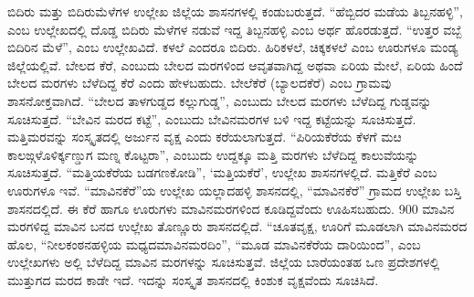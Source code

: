 ಬಿದಿರು ಮತ್ತು ಬಿದಿರುಮೆಳೆಗಳ ಉಲ್ಲೇಖ ಜಿಲ್ಲೆಯ ಶಾಸನಗಳಲ್ಲಿ ಕಂಡುಬರುತ್ತದೆ. “ಹೆಬ್ಬಿದರ ಮಡೆಯ ತಿಬ್ಬನಹಳ್ಳಿ”, ಎಂಬ ಉಲ್ಲೇಖದಲ್ಲಿ ದೊಡ್ಡ ಬಿದಿರು ಮೆಳೆಗಳ ನಡುವೆ ಇದ್ದ ತಿಬ್ಬನಹಳ್ಳಿ ಎಂಬ ಅರ್ಥ ಹೊರಡುತ್ತದೆ. “ಉತ್ತರ ವಬ್ಬೆ ಬಿದಿರಿನ ಮೆಳೆ”, ಎಂಬ ಉಲ್ಲೇಖವಿದೆ. ಕಳಲೆ ಎಂದರೂ ಬಿದಿರು. ಹಿರಿಕಳಲೆ, ಚಿಕ್ಕಕಳಲೆ ಎಂಬ ಊರುಗಳೂ ಮಂಡ್ಯ ಜಿಲ್ಲೆಯಲ್ಲಿವೆ. ಬೇಲದ ಕೆರೆ, ಎಂಬುದು ಬೇಲದ ಮರಗಳಿಂದ ಆವೃತವಾಗಿದ್ದ ಅಥವಾ ಏರಿಯ ಮೇಲೆ, ಏರಿಯ ಹಿಂದೆ ಬೇಲದ ಮರಗಳು ಬೆಳೆದಿದ್ದ ಕೆರೆ ಎಂದು ಹೇಳಬಹುದು. ಬೇಲೆಕೆರೆ (ಬ್ಯಾಲದಕೆರೆ) ಎಂಬ ಗ್ರಾಮವು ಶಾಸನೋಕ್ತವಾಗಿದೆ. “ಬೇಲದ ತಾಳಗುಡ್ಡದ ಕಲ್ಲುಗುಡ್ಡ”, ಎಂಬುದು ಬೇಲದ ಮರಗಳು ಬೆಳೆದಿದ್ದ ಗುಡ್ಡವನ್ನು ಸೂಚಿಸುತ್ತದೆ. “ಬೇವಿನ ಮರದ ಕಟ್ಟೆ”, ಎಂಬುದು ಬೇವಿನಮರಗಳ ಬಳಿ ಇದ್ದ ಕಟ್ಟೆಯನ್ನು ಸೂಚಿಸುತ್ತದೆ. ಮತ್ತಿ\-ಮರವನ್ನು ಸಂಸ್ಕೃತದಲ್ಲಿ ಅರ್ಜುನ ವೃಕ್ಷ ಎಂದು ಕರೆಯಲಾಗುತ್ತದೆ. “ಪಿರಿಯಕೆರೆಯ ಕೆಳಗೆ ಮೞ ಕಾಲಙ್ಗಳೊಳಿರ್ಕ್ಕಣ್ಡುಗ ಮಣ್ನ ಕೊಟ್ಟರಾ”, ಎಂಬುದು ಉದ್ದಕ್ಕೂ ಮತ್ತಿ ಮರಗಳು ಬೆಳೆದಿದ್ದ ಕಾಲುವೆಯನ್ನು ಸೂಚಿಸುತ್ತದೆ. “ಮತ್ತಿಯಕೆರೆಯ ಬಡಗಣಕೋಡಿ”, ‘ಮತ್ತಿಯಕೆರೆ’, ಉಲ್ಲೇಖ ಶಾಸನಗಳಲ್ಲಿದೆ. ಮತ್ತಿಕೆರೆ ಎಂಬ ಊರುಗಳೂ ಇವೆ. “ಮಾವಿನಕೆರೆ”ಯ ಉಲ್ಲೇಖ ಯಲ್ಲಾದಹಳ್ಳಿ ಶಾಸನದಲ್ಲಿ, “ಮಾವಿನಕೆರೆ” ಗ್ರಾಮದ ಉಲ್ಲೇಖ ಬಸ್ತಿ ಶಾಸನದಲ್ಲಿದೆ. ಈ ಕೆರೆ ಹಾಗೂ ಊರುಗಳು ಮಾವಿನಮರಗಳಿಂದ ಕೂಡಿದ್ದವೆಂದು ಊಹಿಸಬಹುದು. 900 ಮಾವಿನ ಮರಗಳಿದ್ದ ಮಾವಿನ ಬನದ ಉಲ್ಲೇಖ ತೊಣ್ಣೂರು ಶಾಸನದಲ್ಲಿದೆ. “ಚೂತವೃಕ್ಷ, ಊರಿಗೆ ಮೂಡಲಾಗಿ ಮಾವಿನಮರದ ಹೊಲ, “ನೀಲಕಂಠನಹಳ್ಳಿಯ ಮಧ್ಯದ\break ಮಾವಿನಮರದಿಂ”, “ಮೂಡ ಮಾವಿನಕೆರೆಯ ದಾರಿಯಿಂದ”, ಎಂಬ ಉಲ್ಲೇಖಗಳು ಅಲ್ಲಿ ಬೆಳೆದಿದ್ದ ಮಾವಿನ ಮರ\-ಗಳನ್ನು ಸೂಚಿಸುತ್ತವೆ. ಜಿಲ್ಲೆಯ ಬಾರೆಯಂತಹ ಒಣ ಪ್ರದೇಶಗಳಲ್ಲಿ ಮುತ್ತುಗದ ಮರದ ಕಾಡೇ ಇದೆ. ಇದನ್ನು ಸಂಸ್ಕೃತ ಶಾಸನದಲ್ಲಿ ಕಿಂಶುಕ ವೃಕ್ಷವೆಂದು ಸೂಚಿಸಿದೆ.

